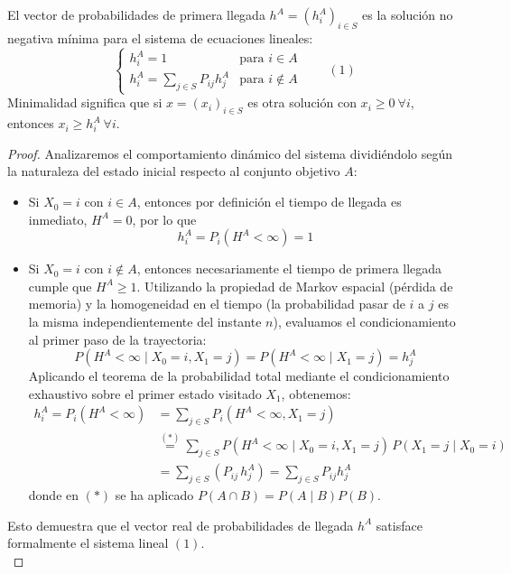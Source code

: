 \begin{teo}
    El vector de probabilidades de primera llegada $h^A = (h_i^A)_{i \in S}$ es la solución no negativa mínima para el sistema de ecuaciones lineales:
    \[
    \begin{cases} 
        h_i^A = 1 & \text{para } i \in A \\ 
        h_i^A = \sum\limits_{j \in S} P_{ij} h_j^A & \text{para } i \notin A 
    \end{cases} \qquad (1)
    \]
    Minimalidad significa que si $x = (x_i)_{i \in S}$ es otra solución con $x_i \geq 0 \ \forall i$, entonces $x_i \geq h_i^A \ \forall i$.
\begin{proof}
    Analizaremos el comportamiento dinámico del sistema dividiéndolo según la naturaleza del estado inicial respecto al conjunto objetivo $A$:
    \begin{itemize}
        \item Si $X_0 = i$ con $i \in A$, entonces por definición el tiempo de llegada es inmediato, $H^A = 0$, por lo que 
        $$h_i^A = P_i(H^A < \infty) = 1$$
        \item Si $X_0 = i$ con $i \notin A$, entonces necesariamente el tiempo de primera llegada cumple que $H^A \geq 1$. Utilizando la propiedad de Markov espacial (pérdida de memoria) y la homogeneidad en el tiempo (la probabilidad pasar de $i$ a $j$ es la misma independientemente del instante $n$), evaluamos el condicionamiento al primer paso de la trayectoria:
        \[ 
        P(H^A < \infty \mid X_0 = i, X_1 = j) = P(H^A < \infty \mid X_1 = j) = h_j^A
        \]
        \noindent
        Aplicando el teorema de la probabilidad total mediante el condicionamiento exhaustivo sobre el primer estado visitado $X_1$, obtenemos:
        \begin{align*}
            h_i^A = P_i(H^A < \infty) &= \sum_{j \in S} P_i(H^A < \infty, X_1 = j) \\
            &\overset{(*)}{=} \sum_{j \in S} P(H^A < \infty \mid X_0 = i, X_1 = j) \, P(X_1 = j \mid X_0 = i) \\
            &= \sum_{j \in S} (P_{ij} \, h_j^A) = \sum_{j \in S} P_{ij} h_j^A
        \end{align*}
        donde en $(*)$ se ha aplicado $P(A \cap B) = P(A \mid B)P(B)$.
    \end{itemize}
    Esto demuestra que el vector real de probabilidades de llegada $h^A$ satisface formalmente el sistema lineal $(1)$. \\


\end{proof}
\end{teo}
